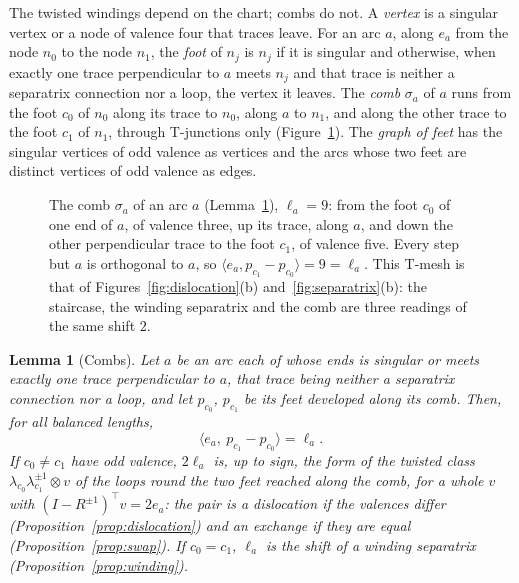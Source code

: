 \documentclass[11pt,a4paper]{article}
\newtheorem{lemma}{Lemma}
\newcommand{\lean}[1]{\texttt{\detokenize{#1}}}
\newenvironment{evidence}[3][]{}{}
\begin{document}
The twisted windings depend on the chart; combs do not. A \emph{vertex} is a
singular vertex or a node of valence four that traces leave. For an arc $a$,
along $e_a$ from the node $n_0$ to the node $n_1$, the \emph{foot} of $n_j$ is
$n_j$ if it is singular and otherwise, when exactly one trace perpendicular to
$a$ meets $n_j$ and that trace is neither a separatrix connection nor a loop,
the vertex it leaves. The \emph{comb} $\sigma_a$ of $a$ runs from the
foot $c_0$ of $n_0$ along its trace to $n_0$, along $a$ to $n_1$, and along the
other trace to the foot $c_1$ of $n_1$, through T-junctions only
(Figure~\ref{fig:comb}). The \emph{graph of feet} has the singular vertices of
odd valence as vertices and the arcs whose two feet are distinct vertices of
odd valence as edges.

\begin{figure}[t]
\centering

\caption{The comb $\sigma_a$ of an arc $a$ (Lemma~\ref{lem:comb}), $\ell_a =
9$: from the foot $c_0$ of one end of $a$, of valence three, up its trace,
along $a$, and down the other perpendicular trace to the foot $c_1$, of
valence five. Every step but $a$ is orthogonal to $a$, so $\langle e_a,
p_{c_1} - p_{c_0} \rangle = 9 = \ell_a$. This T-mesh is that of
Figures~\ref{fig:dislocation}(b) and~\ref{fig:separatrix}(b): the staircase,
the winding separatrix and the comb are three readings of the same shift
$2$.}
\label{fig:comb}
\end{figure}

\begin{evidence}{core}{\lean{comb_reading}, \lean{Pairing.Comb.reading}; the forms: \lean{Combs.comb_dislocation}, \lean{Combs.comb_exchange}, from the comb \lean{Combs.Comb.dislocation}, \lean{Combs.Comb.exchange}; the feet exist on 850 of the 3{,}009 arcs of 50 random instances; assumed: the feet exist, the perpendicular traces develop straight, $e_a$ is an axis of the chart of the comb; the case $c_0 = c_1$ is not formalized}
\begin{lemma}[Combs]\label{lem:comb}
Let $a$ be an arc each of whose ends is singular or meets exactly one trace
perpendicular to $a$, that trace being neither a separatrix connection nor a
loop, and let $p_{c_0}$, $p_{c_1}$ be its feet developed along its comb. Then,
for all balanced lengths,
\[
  \langle e_a,\ p_{c_1} - p_{c_0} \rangle = \ell_a .
\]
If $c_0 \neq c_1$ have odd valence, $2\ell_a$ is, up to sign, the form of the
twisted class $\lambda_{c_0}\lambda_{c_1}^{\pm1} \otimes v$ of the loops round
the two feet reached along the comb, for a whole $v$ with $(I - R^{\pm1})^\top v
= 2e_a$: the pair is a dislocation if the valences differ
(Proposition~\ref{prop:dislocation}) and an exchange if they are equal
(Proposition~\ref{prop:swap}). If $c_0 = c_1$, $\ell_a$ is the shift of a
winding separatrix (Proposition~\ref{prop:winding}).
\end{lemma}
\end{evidence}
\end{document}
